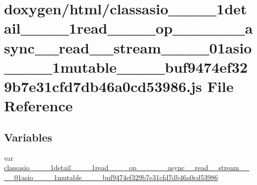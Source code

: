 \hypertarget{classasio____1____1detail____1____1read________op____3____01____async____read____stream____00___f8e6d3a44e022d816626b7e86e456f03}{}\section{doxygen/html/classasio\+\_\+\+\_\+\_\+\+\_\+1detail\+\_\+\+\_\+\_\+\+\_\+1read\+\_\+\+\_\+\+\_\+\+\_\+op\+\_\+\+\_\+\_\+\+\_\+\_\+\+\_\+async\+\_\+\+\_\+read\+\_\+\+\_\+stream\+\_\+\+\_\+\_\+\+\_\+01asio\+\_\+\+\_\+\_\+\+\_\+1mutable\+\_\+\+\_\+\+\_\+\+\_\+buf9474ef329b7e31cfd7db46a0cd53986.js File Reference}
\label{classasio____1____1detail____1____1read________op____3____01____async____read____stream____00___f8e6d3a44e022d816626b7e86e456f03}
\subsection*{Variables}
\begin{DoxyCompactItemize}
\item 
var \hyperlink{classasio____1____1detail____1____1read________op____3____01____async____read____stream____00___f8e6d3a44e022d816626b7e86e456f03_a95ccf9000883b4dc1b75f61360109a4a}{classasio\+\_\+\+\_\+\_\+\+\_\+1detail\+\_\+\+\_\+\_\+\+\_\+1read\+\_\+\+\_\+\+\_\+\+\_\+op\+\_\+\+\_\+\_\+\+\_\+\_\+\+\_\+async\+\_\+\+\_\+read\+\_\+\+\_\+stream\+\_\+\+\_\+\_\+\+\_\+01asio\+\_\+\+\_\+\_\+\+\_\+1mutable\+\_\+\+\_\+\+\_\+\+\_\+buf9474ef329b7e31cfd7db46a0cd53986}
\end{DoxyCompactItemize}


